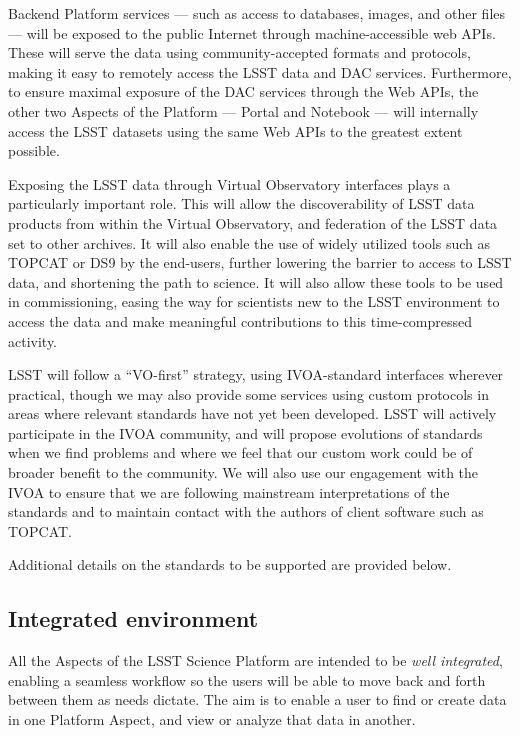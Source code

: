 Backend Platform services --- such as access to
databases, images, and other files --- will be exposed to the public Internet through
machine-accessible web APIs.
These will serve the data using community-accepted
formats and protocols, making it easy to remotely access the LSST data and DAC	
services.
Furthermore, to ensure maximal exposure of the DAC services through the Web APIs,
the other two Aspects of the Platform --- Portal and Notebook --- will
internally access the LSST datasets using the same Web APIs to the greatest extent possible.

Exposing the LSST data through Virtual Observatory interfaces plays a particularly important role.
This will allow the discoverability of LSST data products from within the Virtual Observatory,
and federation of the LSST data set to other archives.
It will also enable the use of widely utilized tools such as TOPCAT or DS9 by the end-users,
further lowering the barrier to access to LSST data, and shortening the path to science.
It will also allow these tools to be used in commissioning,
easing the way for scientists new to the LSST environment to access the data and make meaningful
contributions to this time-compressed activity.

LSST will follow a ``VO-first'' strategy, using IVOA-standard interfaces wherever practical,
though we may also provide some services using custom protocols in areas where relevant standards have not yet been developed.
LSST will actively participate in the IVOA community, and will propose evolutions of standards when we find problems and where we feel that our custom work could be of broader benefit to the community.
We will also use our engagement with the IVOA to ensure that we are following mainstream interpretations of the standards and to maintain contact with the authors of client software such as TOPCAT.

Additional details on the standards to be supported are provided below.

\subsection{Integrated environment}

All the Aspects of the LSST Science Platform are intended to be \textit{well integrated}, enabling a seamless workflow so the users will be able to move back and forth between them as needs dictate.
The aim is to enable a user to find or create data in one Platform Aspect, and view or analyze that data in another.


